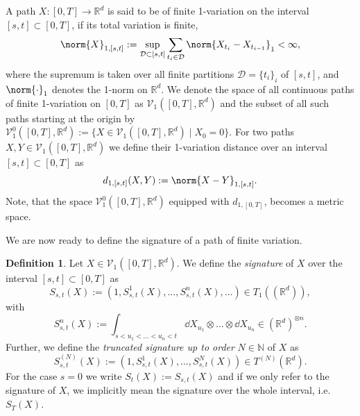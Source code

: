 \documentclass[
    a4paper,
    11pt,
    bibliography=totoc,
    listof=totoc,      
    headinclude=true,
    cleardoublepage=empty,
]{scrbook}
\theoremstyle{plain}
\theoremstyle{definition}
\newtheorem{definition}[theorem]{Definition}
\theoremstyle{remark}
\newcommand{\SetR}{\mathbb R}
\newcommand{\SetN}{\mathbb N}
\begin{document}
A path $X:[0,T]\to\SetR^d$ is said to be of finite 1-variation on the interval 
$[s,t] \subset [0,T]$, if its total variation is finite,
\begin{equation}
\label{eq:1-VariationNorm}
    \norm{X}_{1,[s,t]} := 
    \sup_{\mathcal{D} \subset [s,t]} \sum_{t_i\in\mathcal{D}} 
    \norm{X_{t_i} - X_{t_{i-1}}}_1
        < \infty,
\end{equation}
where the supremum is taken over all finite partitions $\mathcal{D}=\{t_i\}_i$
of $[s,t]$, and $\norm{\cdot}_1$ denotes the 1-norm on $\SetR^d$. We denote 
the space of all continuous paths of finite 1-variation on $[0,T]$ as 
$\mathcal{V}_1([0,T], \SetR^d)$ and the subset of all
such paths starting at the origin by $\mathcal{V}_1^0([0,T], \SetR^d) := \{X
\in \mathcal{V}_1 ([0,T], \SetR^d) \mid X_0=0 \}$. For two paths 
$X,Y\in\mathcal{V}_1([0,T],\SetR^d)$ we define their 1-variation distance over 
an interval $[s,t] \subset [0,T]$ as
\begin{equation}
\label{eq:1-VariationDistance}
    d_{1,[s,t]} (X,Y) := \norm{X-Y}_{1,[s,t]}.
\end{equation}
Note, that the space $\mathcal{V}_1^0([0,T], \SetR^d)$ equipped with 
$d_{1,[0,T]}$, becomes a metric space.

We are now ready to define the signature of a path of finite variation.

\begin{definition}%
\label{def:Signature}
    Let $X\in\mathcal{V}_1([0,T], \SetR^d)$. We define the \textit{signature} 
    of $X$ over the interval $[s,t]\subset[0,T]$ as  
    \begin{equation}
    \label{eq:Signature}
        S_{s,t}(X) 
        := (1, S^1_{s,t}(X), \dots, S^n_{s,t}(X), \dots) \in T_1((\SetR^d)),
    \end{equation}
    with
    \begin{equation*}
        S^n_{s,t}(X) 
        := \int_{s<u_1<\dots<u_n<t} \dd{X_{u_1}}\otimes\dots
            \otimes \dd{X_{u_n}} \in (\SetR^d)^{\otimes n}.
    \end{equation*}
    Further, we define the \textit{truncated signature up to order}
    $N\in\SetN$ of $X$ as
    \begin{equation}
        S^{(N)}_{s,t}(X) 
        := (1, S^1_{s,t}(X), \dots, S^N_{s,t}(X)) \in T^{(N)}(\SetR^d).
    \end{equation}
    For the case $s=0$ we write $S_t(X) := S_{s,t}(X)$ and if we only
    refer to the signature of $X$, we implicitly mean the signature
    over the whole interval, i.e. $S_{T}(X)$. 
\end{definition}
\end{document}
